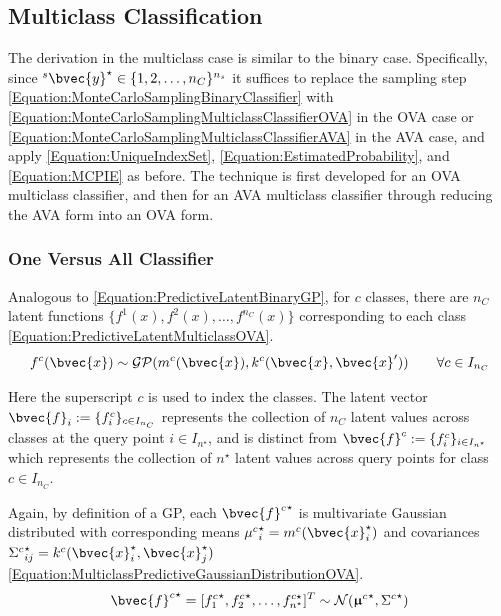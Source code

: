 		\subsection{Multiclass Classification}
		\label{InformativeSeafloorExploration:MCPIE:Multiclass}
		
			The derivation in the multiclass case is similar to the binary case. Specifically, since ${^{s}}\bvec{y}^{\star} \in \{1, 2, \dots, n_{C}\}^{n_{s}}$ it suffices to replace the sampling step \eqref{Equation:MonteCarloSamplingBinaryClassifier} with \eqref{Equation:MonteCarloSamplingMulticlassClassifierOVA} in the OVA case or \eqref{Equation:MonteCarloSamplingMulticlassClassifierAVA} in the AVA case, and apply \eqref{Equation:UniqueIndexSet}, \eqref{Equation:EstimatedProbability}, and \eqref{Equation:MCPIE} as before. The technique is first developed for an OVA multiclass classifier, and then for an AVA multiclass classifier through reducing the AVA form into an OVA form. 
			
			\subsubsection{One Versus All Classifier}
			\label{InformativeSeafloorExploration:MCPIE:Multiclass:OVA}
			
				Analogous to \eqref{Equation:PredictiveLatentBinaryGP}, for $c$ classes, there are $n_{C}$ latent functions $\{f^{1}(x), f^{2}(x), \dots, f^{n_{C}}(x)\}$ corresponding to each class \eqref{Equation:PredictiveLatentMulticlassOVA}. \begin{equation}
					f^{c}(\bvec{x}) \sim \mathcal{GP}(m^{c}(\bvec{x}), k^{c}(\bvec{x}, \bvec{x}')) \qquad \forall c \in I_{n_{C}}
				\label{Equation:PredictiveLatentMulticlassOVA}
				\end{equation}
							
				Here the superscript $c$ is used to index the classes. The latent vector $\bvec{f}_{i} := \{f^{c}_{i}\}_{c \in I_{n_{C}}}$ represents the collection of $n_{C}$ latent values across classes at the query point $i \in I_{n^{\star}}$, and is distinct from $\bvec{f}^{c} := \{f^{c}_{i}\}_{i \in I_{n^{\star}}}$ which represents the collection of $n^{\star}$ latent values across query points for class $c \in I_{n_{C}}$.
				
				Again, by definition of a GP, each ${\bvec{f}^{c}}^{\star}$ is multivariate Gaussian distributed with corresponding means ${\mu^{c}}^{\star}_{i} = m^{c}(\bvec{x}^{\star}_{i})$ and covariances ${\Sigma^{c}}^{\star}_{ij} = k^{c}(\bvec{x}^{\star}_{i}, \bvec{x}^{\star}_{j})$ \eqref{Equation:MulticlassPredictiveGaussianDistributionOVA}. \begin{equation}
					{\bvec{f}^{c}}^{\star} = [{f^{c}_{1}}^{\star}, {f^{c}_{2}}^{\star}, \dots, {f^{c  \star}_{n^{\star}}}]^{T} \sim \mathcal{N}({\vec{\upmu}^{c}}^{\star}, {\Sigma^{c}}^{\star})
				\label{Equation:MulticlassPredictiveGaussianDistributionOVA}
				\end{equation}
				
